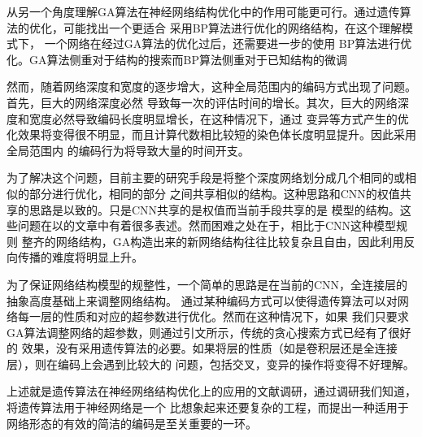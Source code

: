 \documentclass[UTF8,a4paper]{paper}
\begin{document}
从另一个角度理解GA算法在神经网络结构优化中的作用可能更可行。通过遗传算法的优化，可能找出一个更适合
采用BP算法进行优化的网络结构，在这个理解模式下， 一个网络在经过GA算法的优化过后，还需要进一步的使用
BP算法进行优化。GA算法侧重对于结构的搜索而BP算法侧重对于已知结构的微调

然而，随着网络深度和宽度的逐步增大，这种全局范围内的编码方式出现了问题。首先，巨大的网络深度必然
导致每一次的评估时间的增长。其次，巨大的网络深度和宽度必然导致编码长度明显增长，在这种情况下，通过
变异等方式产生的优化效果将变得很不明显，而且计算代数相比较短的染色体长度明显提升。因此采用全局范围内
的编码行为将导致大量的时间开支。

为了解决这个问题，目前主要的研究手段是将整个深度网络划分成几个相同的或相似的部分进行优化，相同的部分
之间共享相似的结构。这种思路和CNN的权值共享的思路是以致的。只是CNN共享的是权值而当前手段共享的是
模型的结构。这些问题在以\cite{DLUGA}的文章中有着很多表述。然而困难之处在于，相比于CNN这种模型规则
整齐的网络结构，GA构造出来的新网络结构往往比较复杂且自由，因此利用反向传播的难度将明显上升。

为了保证网络结构模型的规整性，一个简单的思路是在当前的CNN，全连接层的抽象高度基础上来调整网络结构。
通过某种编码方式可以使得遗传算法可以对网络每一层的性质和对应的超参数进行优化。然而在这种情况下，如果
我们只要求GA算法调整网络的超参数，则通过引文\cite{tsinghua}所示，传统的贪心搜索方式已经有了很好的
效果，没有采用遗传算法的必要。如果将层的性质（如是卷积层还是全连接层），则在编码上会遇到比较大的
问题，包括交叉，变异的操作将变得不好理解。

上述就是遗传算法在神经网络结构优化上的应用的文献调研，通过调研我们知道，将遗传算法用于神经网络是一个
比想象起来还要复杂的工程，而提出一种适用于网络形态的有效的简洁的编码是至关重要的一环。
\end{document}
